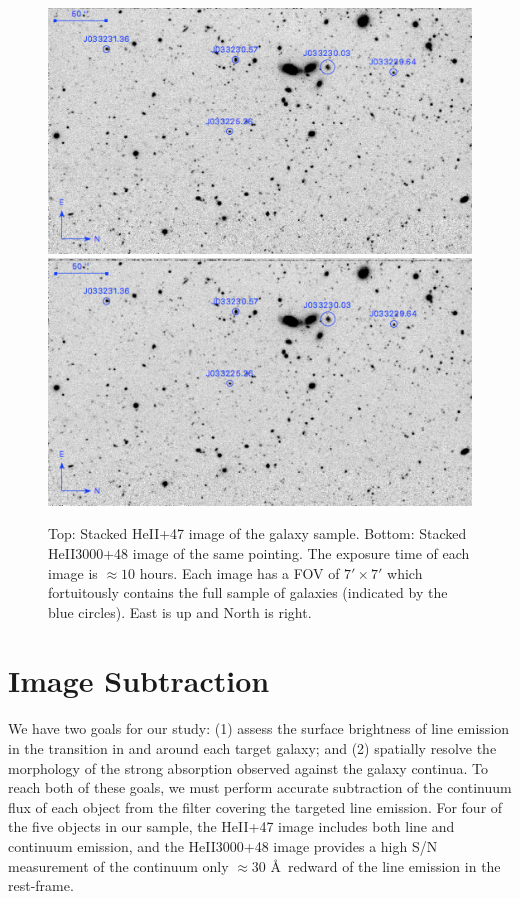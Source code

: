\documentclass[twocolumn]{aastex61}
\begin{document}
\begin{figure}[ht!]
\centering
\includegraphics[scale=.61]{../Figures/HEII_final.png}
\includegraphics[scale=.61]{../Figures/HEII3000_final.png}
\caption{Top: Stacked HeII+47 image of the galaxy sample. Bottom: Stacked HeII3000+48 image of the same pointing. The exposure time of each image is $\approx 10$ hours. Each image has a FOV of $7' \times 7'$ which fortuitously contains the full sample of galaxies (indicated by the blue circles). East is up and North is right.
\label{fig:stacked_image}}
\end{figure}

\section{Image Subtraction}\label{sec.cont_sub}
We have two goals for our study: (1) assess the surface brightness of line emission in the  transition in and around each target galaxy; and (2) spatially resolve the morphology of the strong  absorption observed against the galaxy continua.
To reach both of these goals, we must perform accurate subtraction of the continuum flux of each object from the filter covering the targeted line emission. For four of the five objects in our sample, the HeII+47 image includes both line and continuum emission, and the HeII3000+48 image provides a high S/N measurement of the continuum only $\approx30$ \AA\ redward of the line emission in the rest-frame.
\end{document}
